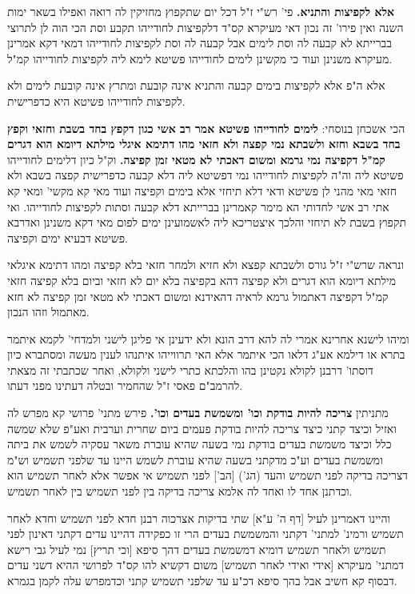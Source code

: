 \documentclass[12pt, openany]{book}
\newcommand{\sethebfont}{
\fontsize{10.5pt}{21.0pt} \selectfont
}
\newcommand{\twocol}[1]{
	{\sethebfont \begin{multicols}{2}
			#1
	\end{multicols}}	
}
\begin{document}
\twocol{\textbf{אלא לקפיצות והתניא.}  פי' רש"י ז"ל דכל יום שתקפוץ מחזיקין לה רואה ואפילו בשאר ימות השנה ואין פירו' זה נכון דאי מעיקרא קס"ד דלקפיצות לחודייהו תקבע וסת הכי הוה לן לתרוצי בברייתא לא קבעה לה וסת לימים אבל קבעה לה וסת לקפיצות לחודייהו דמאי דקא אמרינן מעיקרא משנינן ועוד כי מקשינן לימים לחודייהו פשיטא לימא ליה לקפיצות לחודייהו קמ"ל.\par  אלא ה"פ אלא לקפיצות בימים קבעה והתניא אינה קובעת ומתרץ אינה קובעת לימים ולא לקפיצות לחודייהו פשיטא היא כדפרישית. 
\par הכי אשכחן בנוסחי: \textbf{לימים לחודייהו פשיטא אמר רב אשי כגון דקפץ בחד בשבת וחזאי וקפץ בחד בשבא וחזא ולשבתא נמי קפצה ולא חזאי מהו דתימא איגלי מילתא דיומא הוא דגרים קמ"ל דקפיצה נמי גרמא ומשום דאכתי לא מטאי זמן קפיצה.}  וק"ל כיון דלימים לחודייהו פשיטא ליה וה"ה לקפיצות לחודייהו נמי דפשיטא ליה דלא קבעה כדפרישית קפצה בשבא ולא חזאי מאי מהני לן פשיטא ודאי דלא תיחזי אלא בימים וקפיצה ועוד מאי קא מקשי' ומאי קא אתי רב אשי לחדותי הא מימר קאמרינן בברייתא דלא קבעה וסתות לקפיצות לחודייהו. ואי תקפוץ בשבת לא תיחזי והלכך איצטריכא ליה לאשמועינן ימים לפום מאי דקא משנינן ואדרבא פשיטא דבעיא ימים וקפיצה.\par  ונראה שרש"י ז"ל גורס ולשבתא קפצא ולא חזיא ולמחר חזאי בלא קפיצה ומהו דתימא איגלאי מילתא דיומא הוא דגרים ולא קפיצה דהא בקפיצה בלא יום לא חזאי וביום בלא קפיצה חזאי קמ"ל דקפיצה דאתמול גרמא לראיה דהאידנא ומשום דאכתי לא מטאי זמן קפיצה לא חזא מאתמול וזהו הנכון.\par  ומיהו לישנא אחרינא אמרי לה להא דרב הונא ולא ידעינן אי פליגן לישני ולמדחי' לקמא איתמר בתרא או דילמא אע"ג דלאו הכי איתמר אלא האי תרווייהו איתנהו לענין מעשה ומסתברא כיון דוסתו' דרבנן לקולא נקטינן בהו והלכתא כתרי לישני ולקולא, ואחר שכתבתי זה מצאתי להרמב"ם פאסי ז"ל שהחמיר ובטלה דעתינו מפני דעתו. 
\par מתניתין \textbf{צריכה להיות בודקת וכו' ומשמשת בעדים וכו'.}  פירש מתני' פרושי קא מפרש לה ואזיל וכיצד קתני כיצד צריכה להיות בודקת פעמים ביום שחרית וערבית ואע"פ שלא שמשה כלל וכיצד משמשת בעדים בודקת נמי בשעה שהיא עוברת משאר עסקיה לשמש את ביתה ומשמשת בעדים וע"כ מדקתני בשעה שהיא עוברת לשמש היינו עד שלפני תשמיש וש"מ דצריכה בדיקה לפני תשמיש והעד (הג') [הב'] לפני תשמיש אי אפשר אלא לאחר תשמיש הוא וכדתנן אחד לו ואחד לה אלמא צריכה בדיקה בין לפני תשמיש בין לאחר תשמיש.\par  והיינו דאמרינן לעיל [דף ה' ע"א] שתי בדיקות אצרכוה רבנן חדא לפני תשמיש וחדא לאחר תשמיש ורמינ' למתני' דקתני והמשמשת בעדים הרי זו כפקידה דהיינו עדים דקתני דאינון לפני תשמיש ולאחר תשמיש דומיא דמשמשת בעדים דהך סיפא [וכי תריץ] נמי לעיל גבי רישא דמתני' מעיקרא [אידי ואידי לאחר תשמיש] משום דקשיא להו קס"ד לפרושי ההיא דשני עדים דבסוף קא חשיב אבל בהך סיפא דכ"ע עד שלפני תשמיש קתני וכדמפרש עלה לקמן בגמרא. 
\par}
\end{document}
